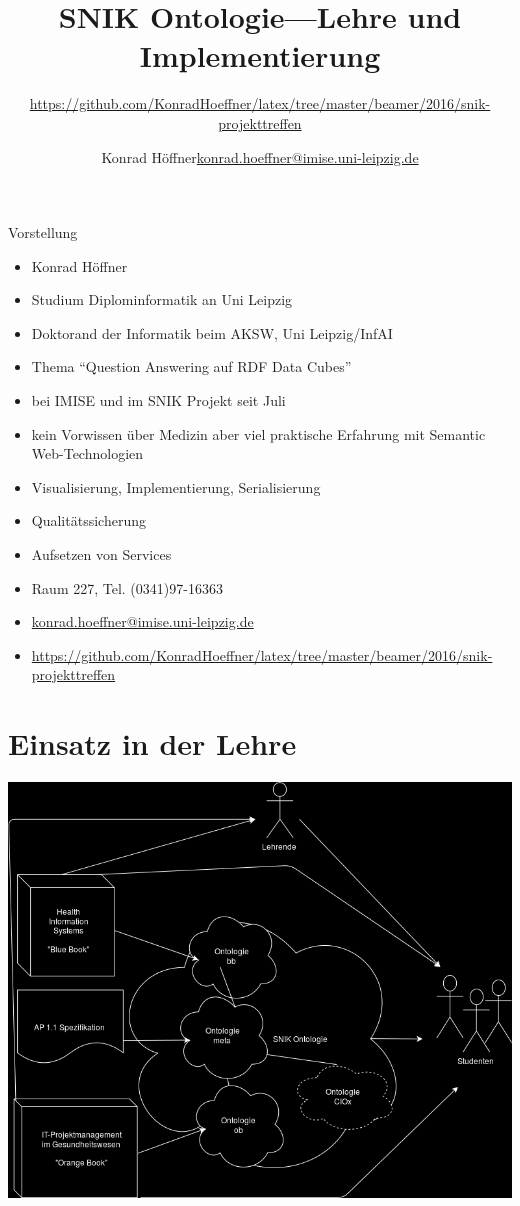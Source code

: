 \documentclass[14pt,aspectratio=1610]{beamer}
\author{\texorpdfstring{Konrad Höffner\newline\url{konrad.hoeffner@imise.uni-leipzig.de}}{Konrad Höffner}}
\title{SNIK Ontologie---Lehre und Implementierung}
\subtitle{\url{https://github.com/KonradHoeffner/latex/tree/master/beamer/2016/snik-projekttreffen}}
\begin{document}
\begin{frame}
\titlepage
\end{frame}

\begin{frame}{Vorstellung}
{
\begin{itemize}
\item Konrad Höffner
\item Studium Diplominformatik an Uni Leipzig
\item Doktorand der Informatik beim AKSW, Uni Leipzig/InfAI
\item Thema \enquote{Question Answering auf RDF Data Cubes}
\item bei IMISE und im SNIK Projekt seit Juli
\item kein Vorwissen über Medizin aber viel praktische Erfahrung mit Semantic Web-Technologien
\end{itemize}
}
{
\begin{itemize}
\item Visualisierung, Implementierung, Serialisierung
\item Qualitätssicherung
\item Aufsetzen von Services
\vspace{1em}
\item Raum 227, Tel. (0341)97-16363
\item \href{mailto://konrad.hoeffner@imise.uni-leipzig.de}{konrad.hoeffner@imise.uni-leipzig.de}
\item \url{https://github.com/KonradHoeffner/latex/tree/master/beamer/2016/snik-projekttreffen}
\end{itemize}
}
\end{frame}

\section{Einsatz in der Lehre}

\begin{frame}{}
\includegraphics[width=\textwidth,height=0.9\textheight,keepaspectratio]{img/lehre.png}
\end{frame}
\end{document}
